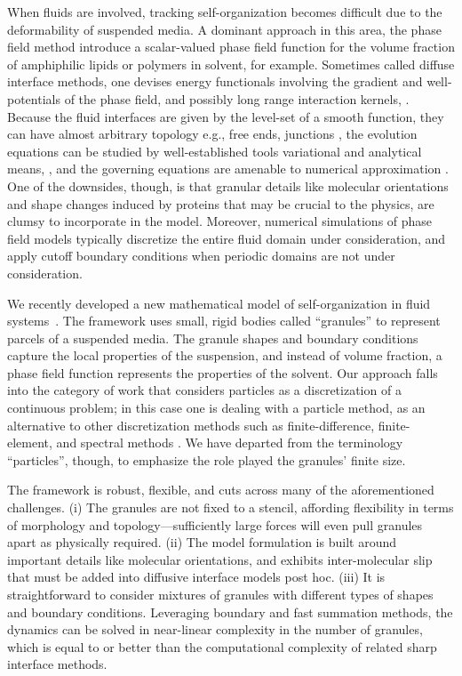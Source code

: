 When fluids are involved,
tracking self-organization
becomes difficult due to the deformability of
suspended media.  A dominant approach in this area,
the phase field method
introduce a scalar-valued phase
field function for the volume fraction of
amphiphilic lipids or polymers in solvent, for example.
Sometimes called diffuse interface
methods, one devises energy functionals involving the gradient and
well-potentials of the phase field, and possibly long range interaction
kernels, 
\cite{Promislow2022UndulatedBI,C9SM01983A,doi:10.1063/5.0009734,
LiAn-Chang16,Choksi2003OnTD}.
Because the fluid interfaces are given by the
level-set of a smooth function,
they can have almost arbitrary topology
e.g., free ends, junctions
\cite{Promislow2017ExistenceBA,Promislow2022UndulatedBI},
the evolution equations can be studied
by well-established tools variational and analytical means,
\cite{Gavish2011CurvatureDF,Dai2019WeakSF,Dai2015CompetitiveGE,
Dai2022GeometricEO,Dai2020MinimizersFT,Dai2013GeometricEO},
and the governing equations are amenable to numerical approximation
\cite{Christlieb2020BenchmarkCO,Christlieb2019CompetitionAC}.
One of the downsides, though, 
is that granular details like molecular orientations and
shape changes induced by proteins that may be crucial to the physics, are
clumsy to incorporate in the model. Moreover, numerical simulations of
phase field models typically discretize the entire fluid domain under
consideration, and apply cutoff boundary conditions when periodic
domains are not under consideration. 

We recently developed a new mathematical model of
self-organization in fluid systems~\cite{FuQuRyYo22,fu-ryh-qua-you2022,Fu2018_SIAM}.
The framework uses small, rigid bodies called ``granules''
to represent parcels of a suspended media.
The granule shapes and boundary conditions
capture the local properties of the suspension,
and instead of volume fraction, a phase field function represents
the properties of the solvent.
Our approach falls into the category of work that considers
particles as a discretization of a continuous problem;
in this case one is dealing with a particle
method, as an alternative to other discretization methods
such as finite-difference, finite-element, and spectral methods
\cite{Wilson2021ComparisonOT}.
We have departed from the terminology
``particles'', though, to emphasize the role played the granules' finite size.


The framework is robust, flexible, and
cuts across many of the aforementioned challenges.
(i) The granules are not fixed to a stencil, 
affording flexibility in terms of morphology and topology---sufficiently
large forces will even pull granules apart as physically required.
(ii) The model formulation is built around important details like molecular orientations,
and exhibits inter-molecular slip that must be added into diffusive interface models
post hoc. 
(iii) It is straightforward to consider mixtures of granules with different
types of shapes and boundary conditions.
Leveraging boundary and fast summation methods, the dynamics can be solved in 
near-linear complexity in the number of granules,
which is equal to or better than 
the computational complexity of related sharp interface methods. 

